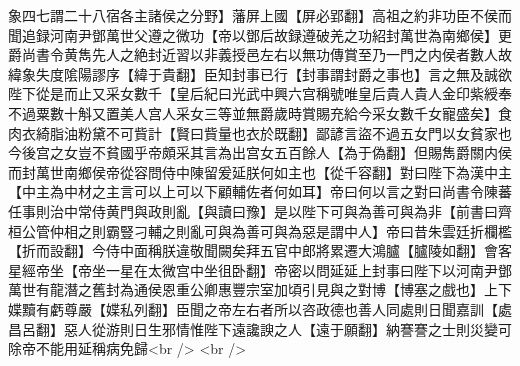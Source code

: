 象四七謂二十八宿各主諸侯之分野】藩屏上國【屏必郢翻】高祖之約非功臣不侯而聞追録河南尹鄧萬世父遵之微功【帝以鄧后故録遵破羌之功紹封萬世為南鄉侯】更爵尚書令黄雋先人之絶封近習以非義授邑左右以無功傳賞至乃一門之内侯者數人故緯象失度隂陽謬序【緯于貴翻】臣知封事已行【封事謂封爵之事也】言之無及誠欲陛下從是而止又采女數千【皇后紀曰光武中興六宫稱號唯皇后貴人貴人金印紫綬奉不過粟數十斛又置美人宫人采女三等並無爵歲時賞賜充給今采女數千女寵盛矣】食肉衣綺脂油粉黛不可貲計【賢曰貲量也衣於既翻】鄙諺言盜不過五女門以女貧家也今後宫之女豈不貧國乎帝頗采其言為出宫女五百餘人【為于偽翻】但賜雋爵關内侯而封萬世南鄉侯帝從容問侍中陳留爰延朕何如主也【從千容翻】對曰陛下為漢中主【中主為中材之主言可以上可以下顧輔佐者何如耳】帝曰何以言之對曰尚書令陳蕃任事則治中常侍黄門與政則亂【與讀曰豫】是以陛下可與為善可與為非【前書曰齊桓公管仲相之則霸豎刁輔之則亂可與為善可與為惡是謂中人】帝曰昔朱雲廷折欄檻【折而設翻】今侍中面稱朕違敬聞闕矣拜五官中郎將累遷大鴻臚【臚陵如翻】會客星經帝坐【帝坐一星在太微宫中坐徂卧翻】帝密以問延延上封事曰陛下以河南尹鄧萬世有龍潛之舊封為通侯恩重公卿惠豐宗室加頃引見與之對博【博塞之戲也】上下媟黷有虧尊嚴【媟私列翻】臣聞之帝左右者所以咨政德也善人同處則日聞嘉訓【處昌呂翻】惡人從游則日生邪情惟陛下遠讒諛之人【遠于願翻】納謇謇之士則災變可除帝不能用延稱病免歸<br />
<br />
